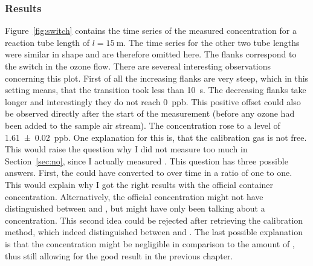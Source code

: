 \subsubsection{Results}
\label{sec:switch-results}

Figure~\ref{fig:switch} contains the time series of the measured
 concentration for a reaction tube length of $l =
\SI{15}{\meter}$. The time series for the other two tube lengths were
similar in shape and are therefore omitted here. The flanks correspond
to the switch in the ozone flow. There are severeal interesting
observations concerning this plot. First of all the increasing flanks
are very steep, which in this setting means, that the transition took
less than \SI{10}{\second}. The decreasing flanks take longer and
interestingly they do not reach \SI{0}{ppb}. This positive offset
could also be observed directly after the start of the measurement
(before any ozone had been added to the 
sample air stream). The concentration rose to a level of
\SI{1.61(2)}{ppb}. One explanation for this is, that the calibration gas is
not  free. This would raise the question why I did not
measure too much  in Section~\ref{sec:no}, since I actually
measured . This question has three possible answers. First, the
 could have converted to  over time in a ratio of
one to one. This would explain why I got the right results with the official
container concentration. Alternatively, the official concentration
might not have distinguished between  and , but might
have only been talking about a  concentration. This second
idea could be rejected after retrieving the calibration method, which
indeed distinguished between  and . The last possible
explanation is that the  concentration might be negligible in
comparison to the amount of , thus still allowing for the good
result in the previous chapter.

